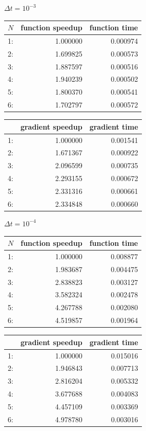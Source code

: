 \begin{center}
$\Delta t=10^{-3}$\\
\begin{tabular}{lrr}
\toprule
{}$N$ &  function speedup &     function time \\
\midrule
1: &  1.000000 &  0.000974 \\
2: &  1.699825 &  0.000573 \\
3: &  1.887597 &  0.000516 \\
4: &  1.940239 &  0.000502 \\
5: &  1.800370 &  0.000541 \\
6: &  1.702797 &  0.000572 \\
\bottomrule
\end{tabular}
\begin{tabular}{lrr}
\toprule
{} &  gradient speedup &    gradient time \\
\midrule
1: &  1.000000 &  0.001541 \\
2: &  1.671367 &  0.000922 \\
3: &  2.096599 &  0.000735 \\
4: &  2.293155 &  0.000672 \\
5: &  2.331316 &  0.000661 \\
6: &  2.334848 &  0.000660 \\
\bottomrule
\end{tabular}
\end{center}
\begin{center}
$\Delta t=10^{-4}$\\
\begin{tabular}{lrr}
\toprule
{} $N$&  function speedup &    function  time \\
\midrule
1: &  1.000000 &  0.008877 \\
2: &  1.983687 &  0.004475 \\
3: &  2.838823 &  0.003127 \\
4: &  3.582324 &  0.002478 \\
5: &  4.267788 &  0.002080 \\
6: &  4.519857 &  0.001964 \\
\bottomrule
\end{tabular}
\begin{tabular}{lrr}
\toprule
{} &  gradient speedup &     gradient time \\
\midrule
1: &  1.000000 &  0.015016 \\
2: &  1.946843 &  0.007713 \\
3: &  2.816204 &  0.005332 \\
4: &  3.677688 &  0.004083 \\
5: &  4.457109 &  0.003369 \\
6: &  4.978780 &  0.003016 \\
\bottomrule
\end{tabular}
\end{center}
